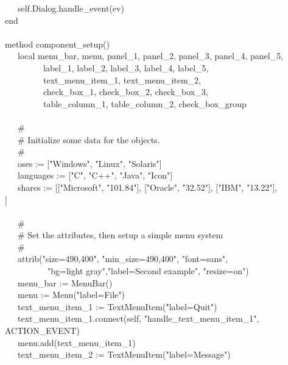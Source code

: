 {\>   \ \ \ self.Dialog.handle\_event(ev) \\
\>   end \\
\ \\
\>   method component\_setup() \\
\>   \ \ \ local menu\_bar, menu, panel\_1, panel\_2, panel\_3, panel\_4, panel\_5, \\
\>   \ \ \ \ \ \ \ \ \ label\_1, label\_2, label\_3, label\_4, label\_5, \\
\>   \ \ \ \ \ \ \ \ \ text\_menu\_item\_1, text\_menu\_item\_2, \\
\>   \ \ \ \ \ \ \ \ \ check\_box\_1, check\_box\_2, check\_box\_3, \\
\>   \ \ \ \ \ \ \ \ \ table\_column\_1, table\_column\_2, check\_box\_group \\
\ \\
\>   \ \ \ \# \\
\>   \ \ \ \# Initialize some data for the objects. \\
\>   \ \ \ \# \\
\>   \ \ \ oses := ["Windows",
"Linux",
"Solaris"] \\
\>   \ \ \ languages := ["C",
"C++", "Java",
"Icon"] \\
\>   \ \ \ shares := [["Microsoft",
"101.84"],
["Oracle",
"32.52"],
["IBM",
"13.22"], \\
\>\>\>
["Intel",
"142.00"]] \\
\ \\
\>   \ \ \ \# \\
\>   \ \ \ \# Set the attributes, then setup a simple menu system \\
\>   \ \ \ \# \\
\>   \ \ \ attrib("size=490,400",
"min\_size=490,400",
"font=sans", \\
\>   \ \ \ \ \ \ \ \ \ \ "bg=light
gray","label=Second example",
"resize=on") \\
\>   \ \ \ menu\_bar := MenuBar() \\
\>   \ \ \ menu := Menu("label=File") \\
\>   \ \ \ text\_menu\_item\_1 :=
TextMenuItem("label=Quit") \\
\>   \ \ \ text\_menu\_item\_1.connect(self,
"handle\_text\_menu\_item\_1",\\
\>\>\>\>\>ACTION\_EVENT) \\
\>   \ \ \ menu.add(text\_menu\_item\_1) \\
\>   \ \ \ text\_menu\_item\_2 :=
TextMenuItem("label=Message") \\
}
